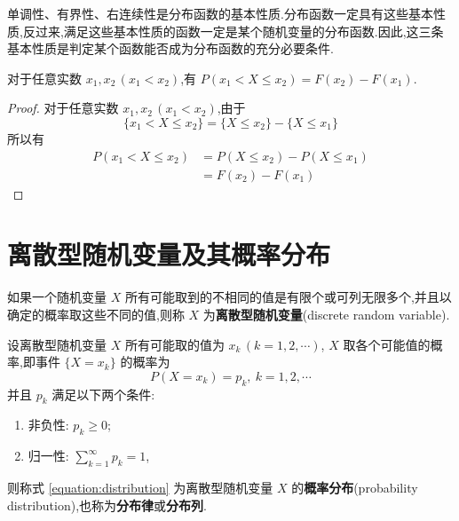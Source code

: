 单调性、有界性、右连续性是分布函数的基本性质.分布函数一定具有这些基本性质,反过来,满足这些基本性质的函数一定是某个随机变量的分布函数.因此,这三条基本性质是判定某个函数能否成为分布函数的充分必要条件.

\begin{property}
    \indent 对于任意实数 $x_1,x_2\, (x_1<x_2)$,有 $P(x_1 < X \leqslant x_2)=F(x_2)-F(x_1)$.
\end{property}

\begin{proof}
    对于任意实数 $x_1,x_2\, (x_1<x_2)$,由于
    $$
    \{x_1 < X \leqslant x_2\} = \{X \leqslant x_2\} - \{X \leqslant x_1\}
    $$
    所以有
    $$
    \begin{aligned}
        P(x_1 < X \leqslant x_2) &= P(X \leqslant x_2) - P(X \leqslant x_1) \\
        &= F(x_2)-F(x_1)
    \end{aligned}
    $$

    \vspace{-1.5em}
\end{proof}

\section{离散型随机变量及其概率分布}

\begin{definition}
    \indent 如果一个随机变量 $X$ 所有可能取到的不相同的值是有限个或可列无限多个,并且以确定的概率取这些不同的值,则称 $X$ 为\textbf{离散型随机变量}(discrete random variable).
\end{definition}

\begin{definition}
    \indent 设离散型随机变量 $X$ 所有可能取的值为 $x_k\, (k=1,2,\cdots)$, $X$ 取各个可能值的概率,即事件 $\{X=x_k\}$ 的概率为
    \begin{equation} \label{equation:distribution}
        P(X=x_k) = p_k, \ k=1,2,\cdots
    \end{equation}
    并且 $p_k$ 满足以下两个条件:
    \begin{enumerate}
        \item 非负性: $p_k \geqslant 0$;\vspace{0.5em}
        \item 归一性: $\displaystyle\sum_{k=1}^\infty p_k = 1$,
    \end{enumerate} \vspace{0.5em}
    则称式 \eqref{equation:distribution} 为离散型随机变量 $X$ 的\textbf{概率分布}(probability distribution),也称为\textbf{分布律}或\textbf{分布列}.
\end{definition}

